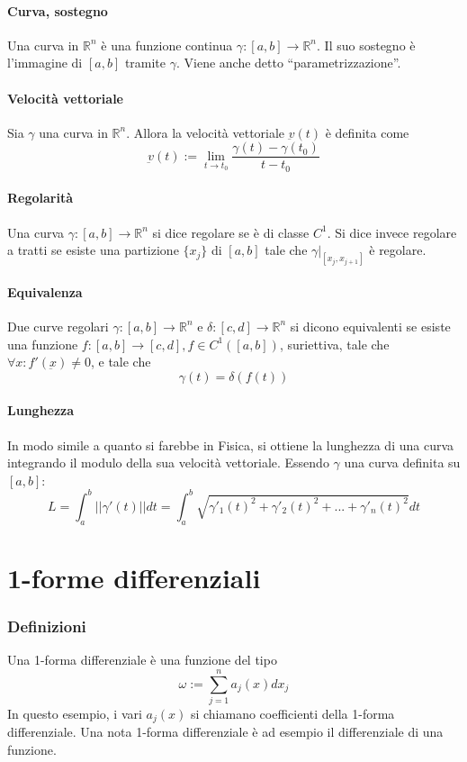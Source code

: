 \documentclass[a4paper,12pt]{article}
\begin{document}
\paragraph{Curva, sostegno}
Una curva in $\mathbb{R}^n$ è una funzione continua $\gamma:[a,b]\rightarrow\mathbb{R}^n$.
Il suo sostegno è l'immagine di $[a,b]$ tramite $\gamma$. Viene anche detto ``parametrizzazione''.
\paragraph{Velocità vettoriale}
Sia $\gamma$ una curva in $\mathbb{R}^n$. Allora la velocità vettoriale $\underbar{v}(t)$ è definita come
$$\underbar{v}(t) := \lim_{t\to t_0} \dfrac{\gamma(t)-\gamma(t_0)}{t-t_0}$$

\paragraph{Regolarità}
Una curva $\gamma:[a,b]\rightarrow\mathbb{R}^n$ si dice regolare se è di classe $C^1$. Si dice invece regolare a tratti se esiste una partizione $\{x_j\}$ di $[a,b]$ tale che $\gamma|_{[x_j, x_{j+1}]}$ è regolare.
\paragraph{Equivalenza}
Due curve regolari $\gamma :[a,b]\rightarrow\mathbb{R}^n$ e $\delta :[c,d]\rightarrow\mathbb{R}^n$ si dicono equivalenti se esiste una funzione 
$f:[a,b]\rightarrow[c,d], f \in C^1([a,b])$, suriettiva, tale che $\forall x: f'(\underbar{x}) \neq 0$, e tale che
$$\gamma(t) = \delta(f(t))$$
\paragraph{Lunghezza}
In modo simile a quanto si farebbe in Fisica, si ottiene la lunghezza di una curva integrando il modulo della sua velocità vettoriale. Essendo $\gamma$ una curva definita su $[a, b]$:
$$L= \int_a^b ||\gamma'(t)|| dt = \int_a^b\sqrt{\gamma'_1(t)^2+\gamma'_2(t)^2+...+\gamma'_n(t)^2}dt$$


\section{1-forme differenziali}
\subsubsection{Definizioni}
Una 1-forma differenziale è una funzione del tipo
$$\omega := \sum_{j=1}^n a_j(x)dx_j$$
In questo esempio, i vari $a_j(x)$ si chiamano coefficienti della 1-forma differenziale.
Una nota 1-forma differenziale è ad esempio il differenziale di una funzione.
\end{document}
